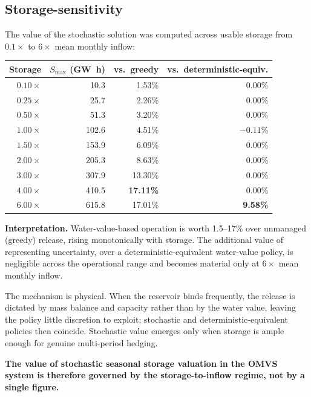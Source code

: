 \documentclass[12pt,a4paper]{article}
\begin{document}
\subsection{Storage-sensitivity}

The value of the stochastic solution was computed across usable storage from
$0.1\times$ to $6\times$ mean monthly inflow:

\begin{center}
\begin{tabular}{rrrr}
\toprule
\textbf{Storage} & \textbf{$S_{\max}$ (\si{\giga\watt\hour})} &
\textbf{vs.\ greedy} & \textbf{vs.\ deterministic-equiv.} \\
\midrule
$0.10\times$ & 10.3  & 1.53\% & 0.00\% \\
$0.25\times$ & 25.7  & 2.26\% & 0.00\% \\
$0.50\times$ & 51.3  & 3.20\% & 0.00\% \\
$1.00\times$ & 102.6 & 4.51\% & $-0.11$\% \\
$1.50\times$ & 153.9 & 6.09\% & 0.00\% \\
$2.00\times$ & 205.3 & 8.63\% & 0.00\% \\
$3.00\times$ & 307.9 & 13.30\% & 0.00\% \\
$4.00\times$ & 410.5 & \textbf{17.11\%} & 0.00\% \\
$6.00\times$ & 615.8 & 17.01\% & \textbf{9.58\%} \\
\bottomrule
\end{tabular}
\end{center}

\textbf{Interpretation.} Water-value-based operation is worth 1.5--17\% over
unmanaged (greedy) release, rising monotonically with storage. The additional
value of representing uncertainty, over a deterministic-equivalent water-value
policy, is negligible across the operational range and becomes material only at
$6\times$ mean monthly inflow.

The mechanism is physical. When the reservoir binds frequently, the release is
dictated by mass balance and capacity rather than by the water value, leaving the
policy little discretion to exploit; stochastic and deterministic-equivalent
policies then coincide. Stochastic value emerges only when storage is ample
enough for genuine multi-period hedging.

\textbf{The value of stochastic seasonal storage valuation in the OMVS system is
therefore governed by the storage-to-inflow regime, not by a single figure.}
\end{document}
